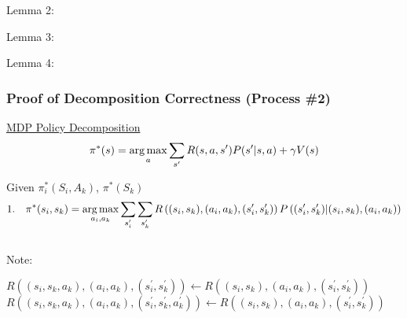 Lemma 2:\\
\vspace*{4cm}

Lemma 3:\\
\vspace*{4cm}

Lemma 4:\\
\vspace*{4cm}

\newpage

 \subsubsection{Proof of Decomposition Correctness (Process \#2)}

\underline{MDP Policy Decomposition}\\

\begin{equation*}
\pi^\ast(s) = \operatorname*{arg\,max}_{a} \sum_{s^\prime} R(s, a, s^\prime) P(s^\prime | s, a) +\gamma V(s)
\end{equation*}

Given $\pi^\ast_i(S_i,A_k)$, $\pi^\ast(S_k)$\\

\begin{equation*}
1.\quad \pi^\ast(s_i,s_k) = \operatorname*{arg\,max}_{a_i, a_k} \sum_{s^\prime_i} \sum_{s^\prime_k} R\left( (s_i,s_k),(a_i,a_k),(s^\prime_i,s^\prime_k)\right) P\left( (s^\prime_i, s^\prime_k) \middle| (s_i, s_k), (a_i, a_k)  \right)
\end{equation*}\\

Note:\qquad
\begin{minipage}[t]{10cm}
$R\left( (s_i,s_k,a_k),(a_i,a_k),(s^\prime_i,s^\prime_k) \right) \leftarrow R\left((s_i,s_k),(a_i,a_k),(s^\prime_i,s^\prime_k)\right)$\\
$R\left( (s_i,s_k,a_k),(a_i,a_k),(s^\prime_i,s^\prime_k,a^\prime_k) \right) \leftarrow R\left((s_i,s_k),(a_i,a_k),(s^\prime_i,s^\prime_k)\right)$
\end{minipage}\\


